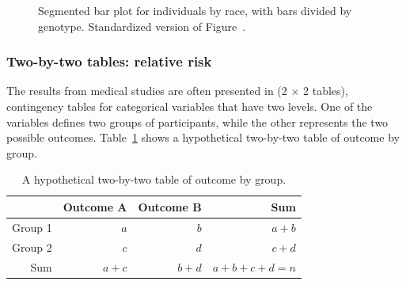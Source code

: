 \begin{figure}[h!]
	\centering
	\caption{ Segmented bar plot for individuals by race, with bars divided by genotype.  Standardized version of Figure~.}
	\label{famussSegBarPlotB}
\end{figure}

\subsubsection{Two-by-two tables: relative risk}
\label{TwoWayTablesRelativeRisk}

The results from medical studies are often presented in  (2 $\times$ 2 tables), contingency tables for categorical variables that have two levels. One of the variables defines two groups of participants, while the other represents the two possible outcomes. Table~\ref{TwoByTwoTable} shows a hypothetical two-by-two table of outcome by group.

\begin{table}
	\centering
	\begin{tabular}{r|rrr}
		\hline
		& Outcome A & Outcome B & Sum\\ 
		\hline
		Group 1 & $a$ & $b$ & $a + b$ \\ 
		Group 2 & $c$ & $d$ & $c + d$ \\
		Sum & $a + c$ & $b + d$ & $a + b + c + d = n$ \\
		\hline
	\end{tabular}	
	\caption{A hypothetical two-by-two table of outcome by group.}
	\label{TwoByTwoTable} 
\end{table}


